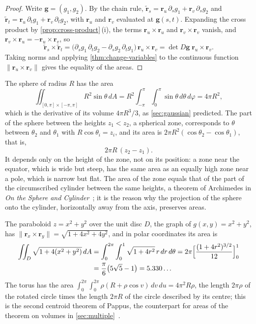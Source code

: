 \begin{proof}
Write $\mathbf g=(g_1,g_2)$. By the chain rule, $\tilde{\mathbf r}_s=\mathbf r_u\,\partial_sg_1+\mathbf r_v\,\partial_sg_2$ and $\tilde{\mathbf r}_t=\mathbf r_u\,\partial_tg_1+\mathbf r_v\,\partial_tg_2$, with $\mathbf r_u$ and $\mathbf r_v$ evaluated at $\mathbf g(s,t)$. Expanding the cross product by \cref{prop:cross-product}\,(i), the terms $\mathbf r_u\times\mathbf r_u$ and $\mathbf r_v\times\mathbf r_v$ vanish, and $\mathbf r_v\times\mathbf r_u=-\mathbf r_u\times\mathbf r_v$, so
\[
\tilde{\mathbf r}_s\times\tilde{\mathbf r}_t=\bigl(\partial_sg_1\,\partial_tg_2-\partial_sg_2\,\partial_tg_1\bigr)\,\mathbf r_u\times\mathbf r_v=\det D\mathbf g\;\mathbf r_u\times\mathbf r_v .
\]
Taking norms and applying \cref{thm:change-variables} to the continuous function $\|\mathbf r_u\times\mathbf r_v\|$ gives the equality of the areas.
\end{proof}

The sphere of radius $R$ has the area
\[
\iint_{[0,\pi]\times[-\pi,\pi]}R^2\sin\theta\,dA=R^2\int_{-\pi}^\pi\int_0^\pi\sin\theta\,d\theta\,d\varphi=4\pi R^2 ,
\]
which is the derivative of its volume $4\pi R^3/3$, as \cref{sec:gaussian} predicted. The part of the sphere between the heights $z_1<z_2$, a spherical zone, corresponds to $\theta$ between $\theta_2$ and $\theta_1$ with $R\cos\theta_i=z_i$, and its area is $2\pi R^2(\cos\theta_2-\cos\theta_1)$, that is,
\[
2\pi R\,(z_2-z_1).
\]
It depends only on the height of the zone, not on its position: a zone near the equator, which is wide but steep, has the same area as an equally high zone near a pole, which is narrow but flat. The area of the zone equals that of the part of the circumscribed cylinder between the same heights, a theorem of Archimedes in \emph{On the Sphere and Cylinder}~\cite{heath1897archimedes}; it is the reason why the projection of the sphere onto the cylinder, horizontally away from the axis, preserves areas.

The paraboloid $z=x^2+y^2$ over the unit disc $D$, the graph of $g(x,y)=x^2+y^2$, has $\|\mathbf r_x\times\mathbf r_y\|=\sqrt{1+4x^2+4y^2}$, and in polar coordinates its area is
\[
\begin{aligned}
\iint_D\sqrt{1+4(x^2+y^2)}\,dA&=\int_0^{2\pi}\int_0^1\sqrt{1+4r^2}\,r\,dr\,d\theta=2\pi\Bigl[\frac{(1+4r^2)^{3/2}}{12}\Bigr]_0^1\\
&=\frac\pi6\bigl(5\sqrt5-1\bigr)=5.330\ldots
\end{aligned}
\]
The torus has the area $\int_0^{2\pi}\int_0^{2\pi}\rho(R+\rho\cos v)\,dv\,du=4\pi^2R\rho$, the length $2\pi\rho$ of the rotated circle times the length $2\pi R$ of the circle described by its centre; this is the second centroid theorem of Pappus, the counterpart for areas of the theorem on volumes in \cref{sec:multiple}~\cite{heath1921}.

